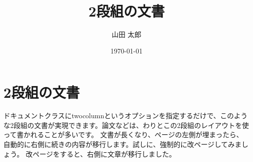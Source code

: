 \documentclass[twocolumn]{ltjsarticle}
\title{2段組の文書}
\author{山田 太郎}
\date{\today}
\begin{document}
\maketitle
\section{2段組の文書}
ドキュメントクラスにtwocolumnというオプションを指定するだけで、このような2段組の文書が実現できます。論文などは、わりとこの2段組のレイアウトを使って書かれることが多いです。
文書が長くなり、ページの左側が埋まったら、自動的に右側に続きの内容が移行します。試しに、強制的に改ページしてみましょう。
\newpage
改ページをすると、右側に文章が移行しました。
\end{document}
